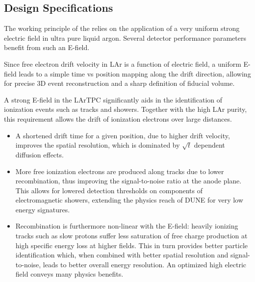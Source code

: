  
\subsection{Design Specifications}
\label{sec:fdsp-hv-des-consid}

%

The working principle of the  relies on the application of a very uniform strong electric field in ultra pure liquid argon. Several detector performance parameters benefit from such an E-field.

Since free electron drift velocity in LAr is a function of electric field, a uniform E-field leads to a simple time vs position mapping along the drift direction, allowing for precise 3D event reconstruction and a sharp definition of fiducial volume.

A strong E-field in the LArTPC significantly aids in the identification of ionization events such as tracks and showers. Together with the high LAr purity, this requirement allows the drift of ionization electrons over large distances.
\begin{itemize}
\item A shortened drift time for a given position, due to higher drift velocity, improves the spatial resolution, which is dominated by $\sqrt t$ dependent diffusion effects.

\item More free ionization electrons are produced along tracks due to lower recombination, thus improving the signal-to-noise ratio at the anode plane.   This allows for lowered detection thresholds on components of electromagnetic showers,  extending the physics reach of DUNE for very low energy  signatures.

\item Recombination is furthermore non-linear with the E-field: heavily ionizing tracks such as slow protons suffer less saturation of free charge production at high specific energy loss at higher fields.  This in turn provides better particle identification which, when combined with better spatial resolution and signal-to-noise, leads to better overall energy resolution. An optimized high electric field conveys many physics benefits.
\end{itemize}

